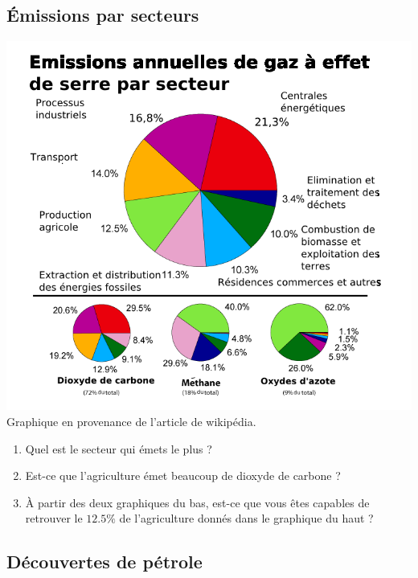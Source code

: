 \subsection{Émissions par secteurs}

\includegraphics[width=17cm]{Emission_de_GES.png}
Graphique en provenance de l'article  de wikipédia.

\begin{enumerate}
    \item
        Quel est le secteur qui émets le plus ?
    \item
        Est-ce que l'agriculture émet beaucoup de dioxyde de carbone ?
    \item
        À partir des deux graphiques du bas, est-ce que vous êtes capables de retrouver le \( 12.5\%\) de l'agriculture donnés dans le graphique du haut ?
\end{enumerate}

\subsection{Découvertes de pétrole}

